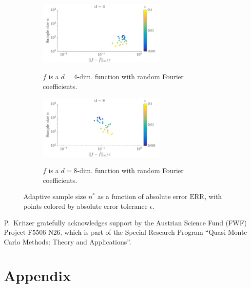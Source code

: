 \documentclass[USenglish]{article}
\theoremstyle{dgthm}
\theoremstyle{dgthm}
\theoremstyle{dgthm}
\theoremstyle{dgthm}
\theoremstyle{dgdef}
\begin{document}
\begin{figure}
\centering
\begin{subfigure}{\textwidth}
\centering
\includegraphics[width=0.7\textwidth]{d4}
\label{fig:four1}
\caption{$f$ is a $d=4$-dim. function with random Fourier coefficients.}
\end{subfigure}
\begin{subfigure}{\textwidth}
\centering
\includegraphics[width=0.7\textwidth]{d8}
\label{fig:four2}
\caption{$f$ is a $d=8$-dim. function with random Fourier coefficients.}
\end{subfigure}
\caption{Adaptive sample size $n^*$ as a function of absolute error $\text{ERR}$, with points colored by absolute error tolerance $\epsilon$.}
\label{fig:four}
\end{figure}


\begin{acknowledgement}
 P.~Kritzer gratefully acknowledges support by the Austrian Science Fund (FWF) Project  F5506-N26, 
which is part of the Special Research Program ``Quasi-Monte Carlo Methods: Theory and Applications''.
\end{acknowledgement}





\section*{Appendix}
\end{document}
